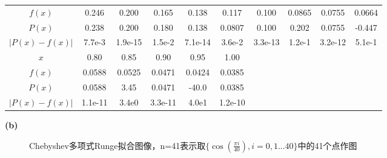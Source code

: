 \documentclass[UTF8]{ctexart}
\begin{document}
\begin{table}[H]
\begin{tabular}{|c|ccccccccc|}
        $f(x)$ & 0.246 & 0.200 & 0.165 & 0.138 & 0.117 & 0.100 & 0.0865 & 0.0755 & 0.0664 \\
        $P(x)$ & 0.238 & 0.200 & 0.180 & 0.138 & 0.0807 & 0.100 & 0.202 & 0.0755 & -0.447\\
        $|P(x)-f(x)|$ & 7.7e-3 & 1.9e-15 & 1.5e-2 & 7.1e-14 & 3.6e-2 & 3.3e-13 & 1.2e-1 & 3.2e-12 & 5.1e-1 \\
        \hline
        $x$ & 0.80 & 0.85 & 0.90 & 0.95 & 1.00 & ~ & ~ & ~ & ~ \\
        $f(x)$ & 0.0588 & 0.0525 & 0.0471 & 0.0424 & 0.0385 & ~ & ~ & ~ & ~\\
        $P(x)$ & 0.0588 & 3.45 & 0.0471 & -40.0 & 0.0385 & ~ & ~ & ~ & ~\\
        $|P(x)-f(x)|$ & 1.1e-11 & 3.4e0 & 3.3e-11 & 4.0e1 & 1.2e-10 & ~ & ~ & ~ & ~ \\
        \hline
    \end{tabular}
\end{table}

\noindent\textbf{(b)}

\begin{figure}[H]
\centering
\subfigure[$f(x),C(x)$图像]{\texttt{[image: 2-b-1]}}
\subfigure[误差曲线]{\texttt{[image: 2-b-2]}}
\caption{Chebyshev多项式Runge拟合图像，n=41表示取$\{\cos(\frac{\pi i}{40}),i=0,1...40\}$中的41个点作图}
\end{figure}
\end{document}
